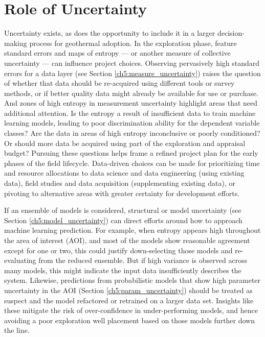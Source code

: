 \section{Role of Uncertainty}
\label{ch7:uncertainty_role}

Uncertainty exists, as does the opportunity to include it in a larger decision-making process for geothermal adoption. In the exploration phase, feature standard errors and maps of entropy --- or another measure of collective uncertainty --- can influence project choices. Observing pervasively high standard errors for a data layer (see Section \ref{ch5:measure_uncertainty}) raises the question of whether that data should be re-acquired using different tools or survey methods, or if better quality data might already be available for use or purchase. And zones of high entropy in measurement uncertainty highlight areas that need additional attention. Is the entropy a result of insufficient data to train machine learning models, leading to poor discrimination ability for the dependent variable classes? Are the data in areas of high entropy inconclusive or poorly conditioned? Or should more data be acquired using part of the exploration and appraisal budget? Pursuing these questions helps frame a refined project plan for the early phases of the field lifecycle. Data-driven choices can be made for prioritizing time and resource allocations to data science and data engineering (using existing data), field studies and data acquisition (supplementing existing data), or pivoting to alternative areas with greater certainty for development efforts.

If an ensemble of models is considered, structural or model uncertainty (see Section \ref{ch5:model_uncertainty}) can direct efforts around how to approach machine learning prediction. For example, when entropy appears high throughout the area of interest (AOI), and most of the models show reasonable agreement except for one or two, this could justify down-selecting those models and re-evaluating from the reduced ensemble. But if high variance is observed across many models, this might indicate the input data insufficiently describes the system. Likewise, predictions from probabilistic models that show high parameter uncertainty in the AOI (Section \ref{ch5:param_uncertainty}) should be treated as suspect and the model refactored or retrained on a larger data set. Insights like these mitigate the risk of over-confidence in under-performing models, and hence avoiding a poor exploration well placement based on those models further down the line.

